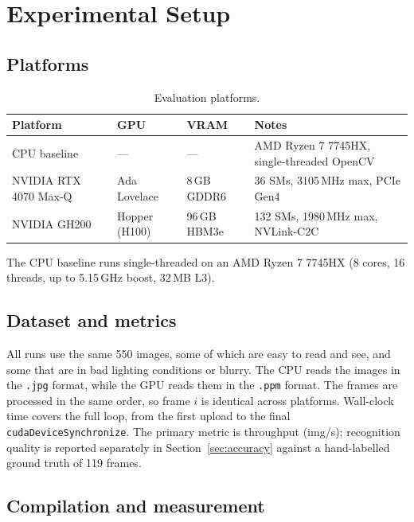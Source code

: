 \section{Experimental Setup}
\label{sec:setup}

\subsection{Platforms}

\begin{table}[H]
\centering
\begin{tabular}{p{3.2cm}p{2.8cm}p{2cm}p{4cm}}
\toprule
Platform & GPU & VRAM & Notes \\
\midrule
CPU baseline          & ---            & ---          & AMD Ryzen 7 7745HX, single-threaded OpenCV \\
NVIDIA RTX 4070 Max-Q & Ada Lovelace   & 8\,GB GDDR6  & 36 SMs, 3105\,MHz max, PCIe Gen4 \\
NVIDIA GH200          & Hopper (H100)  & 96\,GB HBM3e & 132 SMs, 1980\,MHz max, NVLink-C2C \\
\bottomrule
\end{tabular}
\caption{Evaluation platforms.}
\label{tab:platforms}
\end{table}

The CPU baseline runs single-threaded on an AMD Ryzen 7 7745HX (8 cores, 16 threads, up to 5.15\,GHz boost, 32\,MB L3).

\subsection{Dataset and metrics}

All runs use the same 550 images, some of which are easy to read and see, and some that are in bad lighting conditions or blurry.
The CPU reads the images in the \texttt{.jpg} format, while the GPU reads them in the \texttt{.ppm} format.
The frames are processed in the same order, so frame $i$ is identical across platforms.
Wall-clock time covers the full loop, from the first upload to the final \texttt{cudaDeviceSynchronize}.
The primary metric is throughput (img/s); recognition quality is reported separately in Section~\ref{sec:accuracy} against a hand-labelled ground truth of 119 frames.

\subsection{Compilation and measurement}

